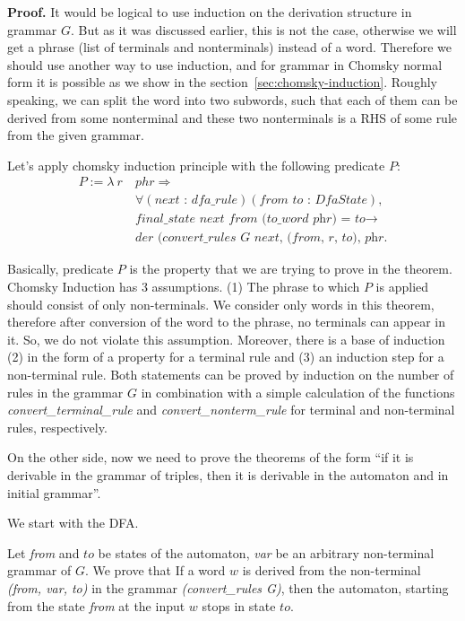 \textbf{Proof.}
It would be logical to use induction on the derivation structure in grammar $G$. But as it was discussed earlier, this is not the case, otherwise we will get a phrase (list of terminals and nonterminals) instead of a word. Therefore we should use another way to use induction, and for grammar in Chomsky normal form it is possible as we show in the section~\ref{sec:chomsky-induction}. Roughly speaking, we can split the word into two subwords, such that each of them can be derived from some nonterminal and these two nonterminals is a RHS of some rule from the given grammar.

Let's apply chomsky induction principle with the following predicate $P$:
\begin{align*}
  P :=  \lambda \ r \ & phr \Rightarrow \\
        &\forall (\textit{next : dfa\_rule}) (\textit{from to : DfaState}), \\
        &\textit{final\_state next from (to\_word phr) = to} \to \\
        &\textit{der (convert\_rules G next, (from, r, to), phr}.
\end{align*}

Basically, predicate $P$ is the property that we are trying to prove in the theorem. Chomsky Induction has 3 assumptions.
(1) The phrase to which $P$ is applied should consist of only non-terminals. We consider only words in this theorem, therefore after conversion of the word to the phrase, no terminals can appear in it. So, we do not violate this assumption.
Moreover, there is a base of induction (2) in the form of a property for a terminal rule and (3) an induction step for a non-terminal rule.
Both statements can be proved by induction on the number of rules in the grammar $G$ in combination with a simple calculation of the functions \textit{convert\_terminal\_rule} and \textit{convert\_nonterm\_rule} for terminal and non-terminal rules, respectively.

On the other side, now we need to prove the theorems of the form  ``if it is derivable in the grammar of triples, then it is derivable in the automaton and in initial grammar''.

We start with the DFA.

\begin{theorem}
	Let \textit{from} and $to$ be states of the automaton, \textit{var} be an arbitrary non-terminal grammar of $G$. We prove that If a word $w$ is derived from the non-terminal \textit{(from, var, to)} in the grammar \textit{(convert\_rules G)}, then the automaton, starting from the state \textit{from} at the input $w$ stops in state $to$.
\end{theorem}

